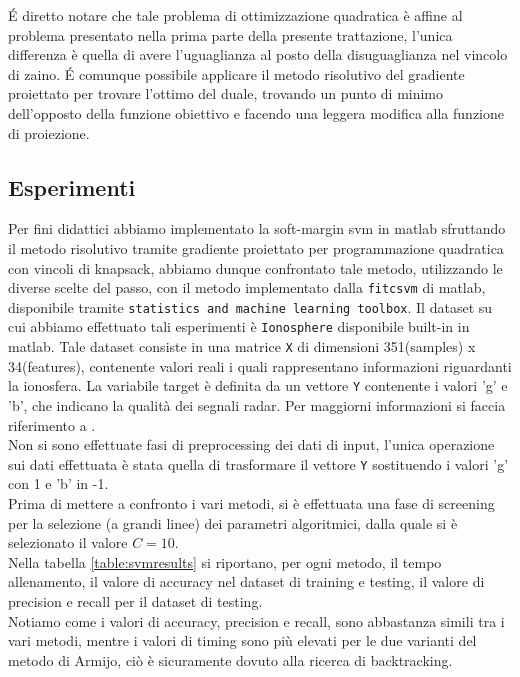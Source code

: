 \documentclass{article}
\begin{document}
\'E diretto notare che tale problema di ottimizzazione quadratica è affine al problema presentato nella prima parte della presente trattazione, l'unica differenza è quella di avere l'uguaglianza al posto della disuguaglianza nel vincolo di zaino.
\'E comunque possibile applicare il metodo risolutivo del gradiente proiettato per trovare l'ottimo del duale, trovando un punto di minimo dell'opposto della funzione obiettivo e facendo una leggera modifica alla funzione di proiezione.
\subsection{Esperimenti}
Per fini didattici abbiamo implementato la soft-margin svm in matlab sfruttando il metodo risolutivo tramite gradiente proiettato per programmazione quadratica con vincoli di knapsack, abbiamo dunque confrontato tale metodo, utilizzando le diverse scelte del passo, con il metodo implementato dalla \texttt{fitcsvm} di matlab, disponibile tramite \texttt{statistics and machine learning toolbox}.
Il dataset su cui abbiamo effettuato tali esperimenti è \texttt{Ionosphere} disponibile built-in in matlab. Tale dataset consiste in una matrice \texttt{X} di dimensioni 351(samples) x 34(features), contenente valori reali i quali rappresentano informazioni riguardanti la ionosfera. La variabile target è definita da un vettore \texttt{Y} contenente i valori 'g' e 'b', che indicano la qualità dei segnali radar. Per maggiorni informazioni si faccia riferimento a \cite{ionosphere_dataset}.\\
Non si sono effettuate fasi di preprocessing dei dati di input, l'unica operazione sui dati effettuata è stata quella di trasformare il vettore \texttt{Y} sostituendo i valori 'g' con 1 e 'b' in -1.\\
Prima di mettere a confronto i vari metodi, si è effettuata una fase di screening per la selezione (a grandi linee) dei parametri algoritmici, dalla quale si è selezionato il valore $C=10$.\\
Nella tabella \ref{table:svmresults} si riportano, per ogni metodo, il tempo allenamento, il valore di accuracy nel dataset di training e testing, il valore di precision e recall per il dataset di testing.\\
Notiamo come i valori di accuracy, precision e recall, sono abbastanza simili tra i vari metodi, mentre i valori di timing sono più elevati per le due varianti del metodo di Armijo, ciò è sicuramente dovuto alla ricerca di backtracking.\\
\end{document}
